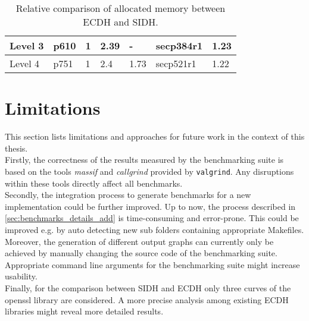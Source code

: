 \begin{table}[H]
\begin{tabular}{|K{1.8cm}|K{1.8cm}|K{1.8cm}|K{2cm}|K{1.8cm}|K{1.8cm}|K{1.8cm}|}
\hline
{}Level 3                                                                                                                                                 & {}p610                                                                    & {}1 & 2.39                                                                                                         & -               & {}secp384r1                                                               & 1.23               \\ 
\hline
{}Level 4                                                                                                                                                 & {}p751                                                                    & {}1 & 2.4                                                                                                          & 1.73            & {}secp521r1                                                               & 1.22               \\
\hline
\end{tabular}
\caption[Comparing allocated memory between \gls{ECDH} and \gls{SIDH}]{Relative comparison of allocated memory between \gls{ECDH} and \gls{SIDH}.}
\label{tab:conclusion_ecdh_sidh_mem}
\end{table}

\section{Limitations}\label{sec:conclusion_limits}

This section lists limitations and approaches for future work in the context of this thesis.
\\
Firstly, the correctness of the results measured by the benchmarking suite is based on the tools \textit{massif} and \textit{callgrind} provided by \texttt{valgrind}. Any disruptions within these tools directly affect all benchmarks.
\\
Secondly, the integration process to generate benchmarks for a new implementation could be further improved. Up to now, the process described in \ref{sec:benchmarks_details_add} is time-consuming and error-prone. This could be improved e.g. by auto detecting new sub folders containing appropriate Makefiles. Moreover, the generation of different output graphs can currently only be achieved by manually changing the source code of the benchmarking suite. Appropriate command line arguments for the benchmarking suite might increase usability.
\\
Finally, for the comparison between \gls{SIDH} and \gls{ECDH} only three curves of the  \gls{openssl} library are considered. A more precise analysis among existing \gls{ECDH} libraries might reveal more detailed results.